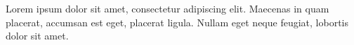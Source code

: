 \imprimircapa
\imprimirfolhaderosto

\imprimirfolhadeaprovacao
{
    \vspace*{19cm}
    \hspace*{7cm}
    \begin{minipage}{0.5\textwidth}
        \mdseries
        \SingleSpacing
    
        Lorem ipsum dolor sit amet, consectetur adipiscing elit. Maecenas in quam placerat, accumsan est eget, placerat ligula. Nullam eget neque feugiat, lobortis dolor sit amet.
    \end{minipage}
    \vspace{1cm}
}

\cleardoublepage


\listoffigures*
\cleardoublepage%

\listofequations*
\cleardoublepage

\listofquadros*
\cleardoublepage

\listoftables*
\cleardoublepage



\tableofcontents*
\cleardoublepage%